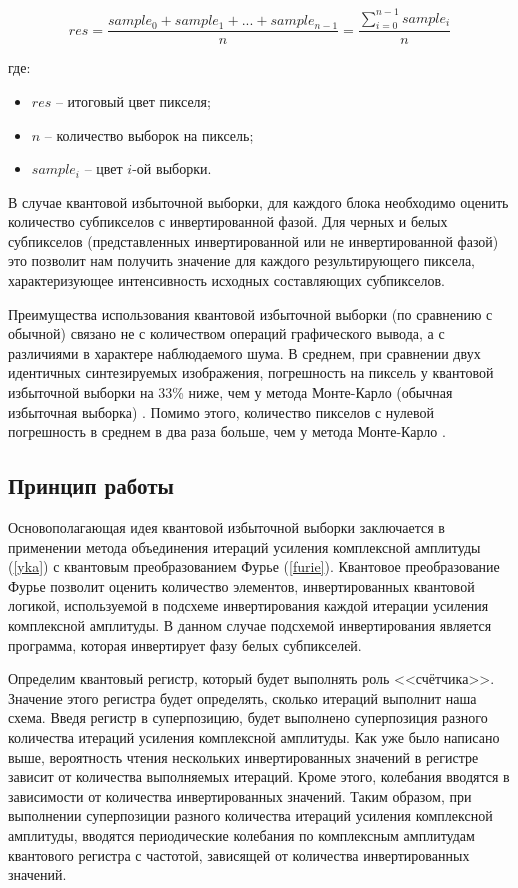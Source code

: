 \begin{equation}
	\label{for:supersampling}
	res = \frac{sample_{0} + sample_{1} + ... + sample_{n-1}}{n} = \frac{\sum_{i=0}^{n - 1} sample_{i}}{n}
\end{equation}

где:

\begin{itemize}
	\item $res$ -- итоговый цвет пикселя;
	\item $n$ -- количество выборок на пиксель;
	\item $sample_{i}$ -- цвет $i$-ой выборки.
\end{itemize}

В случае квантовой избыточной выборки, для каждого блока необходимо оценить количество субпикселов с инвертированной фазой. Для черных и белых субпикселов (представленных инвертированной или не инвертированной фазой) это позволит нам получить значение для каждого результирующего пиксела, характеризующее интенсивность исходных составляющих субпикселов.

Преимущества использования квантовой избыточной выборки (по сравнению с обычной) связано не с количеством операций графического вывода, а с различиями в характере наблюдаемого шума. В среднем, при сравнении двух идентичных синтезируемых изображения, погрешность на пиксель у квантовой избыточной выборки на 33\% ниже, чем у метода Монте-Карло (обычная избыточная выборка) \cite{PQC-prcnt}. Помимо этого, количество пикселов с нулевой погрешность в среднем в два раза больше, чем у метода Монте-Карло \cite{PQC-prcnt}.

\subsection{Принцип работы}

Основополагающая идея квантовой избыточной выборки заключается в применении метода объединения итераций усиления комплексной амплитуды (\ref{yka}) с квантовым преобразованием Фурье (\ref{furie}). Квантовое преобразование Фурье позволит оценить количество элементов, инвертированных квантовой логикой, используемой в подсхеме инвертирования каждой итерации усиления комплексной амплитуды. В данном случае подсхемой инвертирования является программа, которая инвертирует фазу белых субпикселей.

Определим квантовый регистр, который будет выполнять роль <<счётчика>>. Значение этого регистра будет определять, сколько итераций выполнит наша схема. Введя регистр в суперпозицию, будет выполнено суперпозиция разного количества итераций усиления комплексной амплитуды. Как уже было написано выше, вероятность чтения нескольких инвертированных значений в регистре зависит от количества выполняемых итераций. Кроме этого, колебания вводятся в зависимости от количества инвертированных значений. Таким образом, при выполнении суперпозиции разного количества итераций усиления комплексной амплитуды, вводятся периодические колебания по комплексным амплитудам квантового регистра с частотой, зависящей от количества инвертированных значений.

